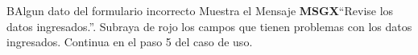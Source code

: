 		\begin{UCtrayectoriaA}{B}{Algun dato del formulario incorrecto}
			\UCpaso Muestra el Mensaje {\bf MSGX}``Revise los datos ingresados.''.
                \UCpaso Subraya de rojo los campos que tienen problemas con los datos ingresados.
			\UCpaso Continua en el paso 5 del caso de uso.
		\end{UCtrayectoriaA}

